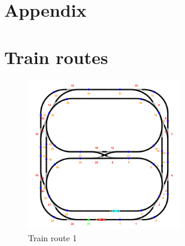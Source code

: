 \documentclass{article}
\begin{document}
    \newpage


    \section*{Appendix}
    \section{Train routes}
    \begin{figure}[!htb]
        \centering
        \includegraphics[width=0.6\textwidth]{./doc/assets/parcoursA}
        \caption{Train route 1}
    \end{figure}
\end{document}
